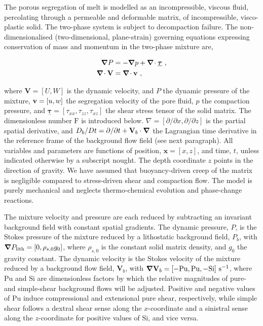 \documentclass[12pt,a4paper]{article}
\begin{document}
The porous segregation of melt is modelled as an incompressible, viscous fluid, percolating through a permeable and deformable matrix, of incompressible, visco-plastic solid. The two-phase system is subject to decompaction failure. The non-dimensionalised (two-dimensional, plane-strain) governing equations expressing conservation of mass and momentum in the two-phase mixture are,
\begin{linenomath*}
\begin{subequations}
\label{eq:governing}
\begin{align}
	\label{eq:moment-mixture}
	\mbox{\boldmath $\nabla$} P &= - \mbox{\boldmath $\nabla$} p + \mbox{\boldmath $\nabla$}\!\cdot \underline{\boldsymbol{\tau}}  \ , \\
	\label{eq:mass-mixture}
	\mbox{\boldmath $\nabla$}\!\cdot \mathbf{V} &= \mbox{\boldmath $\nabla$}\!\cdot \mbox{{\bf v}} \ ,
\end{align}
\end{subequations}
\end{linenomath*}
where $\mathbf{V} = [U,W]$ is the dynamic velocity, and $P$ the dynamic pressure of the mixture, $\mbox{{\bf v}} = [u,w]$ the segregation velocity of the pore fluid, $p$ the compaction pressure, and $\underline{\boldsymbol{\tau}} = [\tau_{xx},\tau_{zz},\tau_{xz}]$ the shear stress tensor of the solid matrix. The dimensionless number $\mathrm{F}$ is introduced below. $\nabla = [\partial/\partial x,\partial/\partial z]$ is the partial spatial derivative, and $D_b/Dt = \partial/\partial t + \mathbf{V}_b \cdot \mbox{\boldmath $\nabla$}$ the Lagrangian time derivative in the reference frame of the background flow field (see next paragraph). All variables and parameters are functions of position, $\mathbf{x} = [x,z]$, and time, $t$, unless indicated otherwise by a subscript nought. The depth coordinate $z$ points in the direction of gravity. We have assumed that buoyancy-driven creep of the matrix is negligible compared to stress-driven shear and compaction flow. The model is purely mechanical and neglects thermo-chemical evolution and phase-change reactions.

The mixture velocity and pressure are each reduced by subtracting an invariant background field with constant spatial gradients. The dynamic pressure, $P$, is the Stokes pressure of the mixture reduced by a lithostatic background field, $P_b$, with $\mbox{\boldmath $\nabla$} P_\mathrm{lith} = [0,\rho_{s,0} g_0]$, where $\rho_{s,0}$ is the constant solid matrix density, and $g_0$ the gravity constant. The dynamic velocity is the Stokes velocity of the mixture reduced by a background flow field, $\mathbf{V}_b$, with $\mbox{\boldmath $\nabla$} \mathbf{V}_b = [-\mathrm{Pu}, \mathrm{Pu}, -\mathrm{Si}] \ \mathrm{s}^{-1}$, where $\mathrm{Pu}$ and $\mathrm{Si}$ are dimensionless factors by which the relative magnitudes of pure- and simple-shear background flows will be adjusted. Positive and negative values of $\mathrm{Pu}$ induce compressional and extensional pure shear, respectively, while simple shear follows a dextral shear sense along the $x$-coordinate and a sinistral sense along the $z$-coordinate for positive values of $\mathrm{Si}$, and vice versa.
\end{document}
